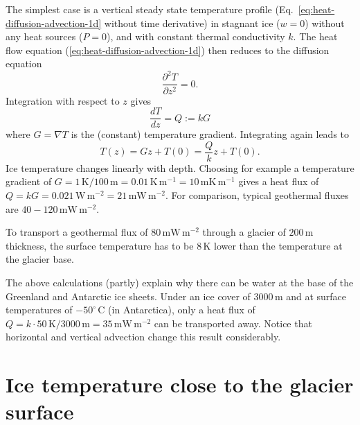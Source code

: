 \documentclass[parskip=half]{scrartcl}
\newcommand{\unit}[1]{\ensuremath{\,\mathrm{#1}}}
\newcommand{\cels}[1]{\ensuremath{#1^{\circ}\,\mathrm{C}}}
\begin{document}
The simplest case is a vertical steady state temperature profile
(Eq.~\ref{eq:heat-diffusion-advection-1d} without time derivative) in stagnant
ice ($w=0$) without any heat sources ($P=0$), and with constant thermal
conductivity $k$.  The heat flow equation
(\ref{eq:heat-diffusion-advection-1d}) then reduces to the diffusion equation
%
\begin{equation}
 \label{eq:diffusion-1d}
 \frac{\partial^2T}{\partial z^2} = 0.
\end{equation}
%
Integration with respect to $z$ gives
%
\begin{equation}
 \label{eq:diffusion-1d-1int}
 \frac{dT}{d z} = Q := k G
\end{equation}
%
where $G = \nabla T$ is the (constant) temperature gradient. Integrating again
leads to
%
\begin{equation}
 \label{eq:diffusion-1d-2int}
 T(z) = G z + T(0) = \frac{Q}{k} z + T(0).
\end{equation}
%
Ice temperature changes linearly with depth.  Choosing for example a
temperature gradient of $G=1\unit{K}/ 100\unit{m} = 0.01\unit{K}\unit{m}^{-1}
= 10 \unit{mK}\unit{m}^{-1}$ gives a heat flux of $Q = kG = 0.021\unit{W}
\unit{m}^{-2} = 21\unit{mW} \unit{m}^{-2}$.  For comparison, typical
geothermal fluxes are $40- 120 \unit{mW} \unit{m}^{-2}$.

To transport a geothermal flux of $80 \unit{mW} \unit{m}^{-2}$ through a
glacier of $200\unit{m}$ thickness, the surface temperature has to be
$8\unit{K}$ lower than the temperature at the glacier base.

The above calculations (partly) explain why there can be water at the base of
the Greenland and Antarctic ice sheets.  Under an ice cover of $3000\unit{m}$
and at surface temperatures of \cels{-50} (in Antarctica), only a heat flux of
$Q=k \cdot 50\unit{K}/3000\unit{m}= 35\unit{mW}\unit{m}^{-2}$ can be
transported away.  Notice that horizontal and vertical advection change this
result considerably.


\section{Ice temperature close to the glacier surface}
\label{sec:ice-temp-surface}
\end{document}
